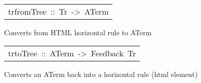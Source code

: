 \begin{haddockdesc}
\item[\begin{tabular}{@{}l}
trfromTree\ ::\ Tr\ ->\ ATerm
\end{tabular}]\haddockbegindoc
Converts from HTML horizontal rule to ATerm
\par

\end{haddockdesc}
\begin{haddockdesc}
\item[\begin{tabular}{@{}l}
trtoTree\ ::\ ATerm\ ->\ Feedback\ Tr
\end{tabular}]\haddockbegindoc
Converts an ATerm back into a horizontal rule (html element)
\par

\end{haddockdesc}